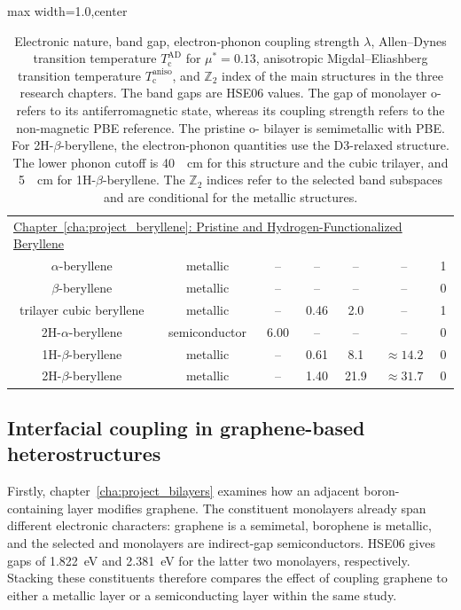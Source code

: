 \begin{table}[!htbp]
\begin{adjustbox}{max width=1.0\linewidth,center}
\begin{tabular}{ccccccc}
\multicolumn{7}{l}{\hyperref[cha:project_beryllene]{Chapter~\ref*{cha:project_beryllene}: Pristine and Hydrogen-Functionalized Beryllene}} \\
$\alpha$-beryllene & metallic & -- & -- & -- & -- & 1 \\
\rowcolor{gray!15}
$\beta$-beryllene & metallic & -- & -- & -- & -- & 0 \\
trilayer cubic beryllene & metallic & -- & 0.46 & 2.0 & -- & 1 \\
\rowcolor{gray!15}
2H-$\alpha$-beryllene & semiconductor & 6.00 & -- & -- & -- & 0 \\
1H-$\beta$-beryllene & metallic & -- & 0.61 & 8.1 & $\approx 14.2$ & 0 \\
\rowcolor{gray!15}
2H-$\beta$-beryllene & metallic & -- & 1.40 & 21.9 & $\approx 31.7$ & 0 \\
\hline
\end{tabular}
\end{adjustbox}
\caption{Electronic nature, band gap, electron-phonon coupling strength $\lambda$,
Allen--Dynes transition temperature $T_\mathrm{c}^{\mathrm{AD}}$ for $\mu^*=0.13$,
anisotropic Migdal--Eliashberg transition temperature $T_\mathrm{c}^{\mathrm{aniso}}$,
and $\mathbb{Z}_2$ index of the main structures in the three research chapters.
The band gaps are HSE06 values.
The gap of monolayer o- refers to its antiferromagnetic state, whereas its coupling strength refers to the non-magnetic PBE reference.
The pristine o- bilayer is semimetallic with PBE.
For 2H-$\beta$-beryllene, the electron-phonon quantities use the D3-relaxed structure.
The lower phonon cutoff is \qty{40}{\per\centi\metre} for this structure and the cubic trilayer, and \qty{5}{\per\centi\metre} for 1H-$\beta$-beryllene.
The $\mathbb{Z}_2$ indices refer to the selected band subspaces and are conditional for the metallic structures.}
\label{tab:conclusion_material_summary}
\end{table}

\FloatBarrier
\subsection{Interfacial coupling in graphene-based heterostructures}

Firstly, chapter~\ref{cha:project_bilayers} examines how an adjacent boron-containing layer modifies graphene.
The constituent monolayers already span different electronic characters: graphene is a semimetal, borophene is metallic, and the selected  and  monolayers are indirect-gap semiconductors.
HSE06 gives gaps of \qty{1.822}{\electronvolt} and \qty{2.381}{\electronvolt} for the latter two monolayers, respectively.
Stacking these constituents therefore compares the effect of coupling graphene to either a metallic layer or a semiconducting layer within the same study.

